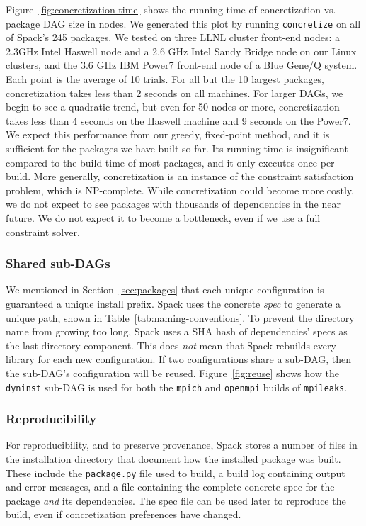 Figure~\ref{fig:concretization-time} shows the running time of concretization vs.
package DAG size in nodes.  We generated this plot by running {\tt concretize}
on all of Spack's 245 packages. We tested on three LLNL cluster front-end nodes:
a 2.3GHz Intel Haswell node and a 2.6 GHz Intel Sandy Bridge node on our Linux
clusters, and the 3.6 GHz IBM Power7 front-end node of a Blue Gene/Q system.
Each point is the average of 10 trials.  For all but the 10
largest packages, concretization takes less than 2 seconds on all machines.
For larger DAGs, we begin to see a quadratic trend, but even for 50 nodes or more,
concretization takes less than 4 seconds on the Haswell machine and 9 seconds on the
Power7.
%
We expect this performance from our greedy, fixed-point method, and
it is sufficient for the packages we have built so far.
Its running time is insignificant compared to the build time of
most packages, and it only executes
once per build.
More generally, concretization is an instance of the constraint
satisfaction problem, which is NP-complete. While concretization could become
more costly, we do not expect to see packages with
thousands of dependencies in the near future. We do not expect
it to become a bottleneck, even if we use a full constraint solver.

\subsubsection{Shared sub-DAGs}
\label{sec:directory-layout}

We mentioned in Section~\ref{sec:packages} that each unique configuration is
guaranteed a unique install prefix. Spack uses the concrete {\it spec}
to generate a unique path, shown in Table~\ref{tab:naming-conventions}.
To prevent the directory name from growing too long, Spack uses a SHA hash of
dependencies' specs as the last directory component.  This
does {\it not} mean that Spack rebuilds every library for each new configuration.
If two configurations share a sub-DAG, then the sub-DAG's configuration will
be reused.  Figure~\ref{fig:reuse} shows how the {\tt dyninst} sub-DAG is used for
both the {\tt mpich} and {\tt openmpi} builds of {\tt mpileaks}.


\subsubsection{Reproducibility}


For reproducibility, and to preserve provenance, Spack stores a number of
files in the installation directory that document how the installed package was
built.  These include the {\tt package.py} file used to build, a build log
containing output and error messages, and a file containing the complete
concrete spec for the package {\it and} its dependencies. The spec file can be
used later to reproduce the build, even if concretization preferences have changed.

